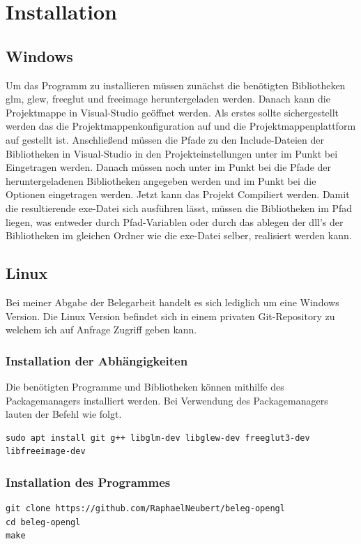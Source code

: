 \documentclass{article}
\begin{document}
\section{Installation}
\subsection{Windows}
Um das Programm zu installieren müssen zunächst die benötigten Bibliotheken glm, glew, freeglut und freeimage
heruntergeladen werden. Danach kann die Projektmappe in Visual-Studio geöffnet werden. Als erstes sollte sichergestellt
werden das die Projektmappenkonfiguration auf  und die Projektmappenplattform auf  gestellt ist.
Anschließend müssen die Pfade zu den Include-Dateien der Bibliotheken in Visual-Studio in 
den Projekteinstellungen unter  im Punkt  bei 
Eingetragen werden. Danach müssen noch unter  im Punkt  bei 
 die Pfade der heruntergeladenen Bibliotheken angegeben werden
und im Punkt  bei  die Optionen 
eingetragen werden. Jetzt kann das Projekt Compiliert werden. Damit die resultierende exe-Datei sich ausführen lässt,
müssen die Bibliotheken im Pfad liegen, was entweder durch Pfad-Variablen oder durch das ablegen der dll's  der Bibliotheken
im gleichen Ordner wie die exe-Datei selber, realisiert werden kann.
\subsection{Linux}
Bei meiner Abgabe der Belegarbeit handelt es sich lediglich um eine Windows Version. Die Linux Version befindet sich in einem
privaten Git-Repository zu welchem ich auf Anfrage Zugriff geben kann.
\subsubsection{Installation der Abhängigkeiten}
Die benötigten Programme und Bibliotheken können mithilfe des Packagemanagers installiert werden.
Bei Verwendung des Packagemanagers  lauten der Befehl wie folgt.
\lstset{language=bash}
\begin{lstlisting}
sudo apt install git g++ libglm-dev libglew-dev freeglut3-dev libfreeimage-dev
\end{lstlisting}
\subsubsection{Installation des Programmes}
\begin{lstlisting}
git clone https://github.com/RaphaelNeubert/beleg-opengl
cd beleg-opengl
make
\end{lstlisting}
\newpage
\end{document}
